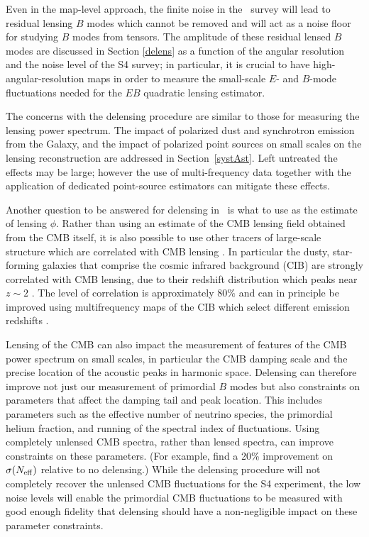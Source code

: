 Even in the map-level approach, the finite noise in the \cmbexp\ survey will lead to residual lensing $B$ modes which cannot be removed and will act as a noise floor for studying $B$ modes from tensors.  The amplitude of these residual lensed $B$ modes are discussed in Section \ref{delens} as a function of the angular resolution and the noise level of the S4 survey; in particular, it is crucial to have high-angular-resolution maps in order to measure the small-scale $E$- and $B$-mode fluctuations needed for the $EB$ quadratic lensing estimator.

The concerns with the delensing procedure are similar to those for measuring the lensing power spectrum. The impact of polarized dust and synchrotron emission from the Galaxy, and the impact of polarized point sources on small scales on the lensing reconstruction are addressed in Section~\ref{systAst}. Left untreated the effects may be large; however the use of  multi-frequency data together with the application of dedicated point-source estimators can mitigate these effects.

Another question to be answered for delensing in \cmbexp\ is what to use as the estimate of lensing $\phi$.
Rather than using an estimate of the CMB lensing field obtained from the CMB itself, it is also possible to use other tracers of large-scale structure which are correlated with  CMB lensing \cite{Smith:2010gu}.  In particular the dusty, star-forming galaxies that comprise the cosmic infrared background (CIB) are strongly correlated with CMB lensing, due to their redshift distribution which peaks near $z \sim 2$ \cite{Sherwin:2015baa,Simard:2014aqa}.  The level of correlation is approximately $80\%$ \cite{Ade:2013lta} and can in principle be improved using multifrequency maps of the CIB which select different emission redshifts \cite{Sherwin:2015baa}.  

Lensing of the CMB can also impact the measurement of features of the CMB power spectrum on small scales, in particular the CMB damping scale and the precise location of the acoustic peaks in harmonic space.  Delensing can therefore improve not just our measurement of primordial $B$ modes but also constraints on parameters that affect the damping tail and peak location.
This includes parameters such as the effective number of neutrino species,  the primordial helium fraction, and running of the spectral index of fluctuations.  Using completely unlensed CMB spectra, rather than lensed spectra, can improve constraints on these parameters. (For example, \cite{Baumann:2015rya} find a 20\% improvement on $\sigma(N_\mathrm{eff})$ relative to no delensing.)  While the delensing procedure will not completely recover the unlensed CMB fluctuations for the S4 experiment, the low noise levels will enable the primordial CMB fluctuations to be measured with good enough fidelity that delensing should have a non-negligible impact on these parameter constraints.
